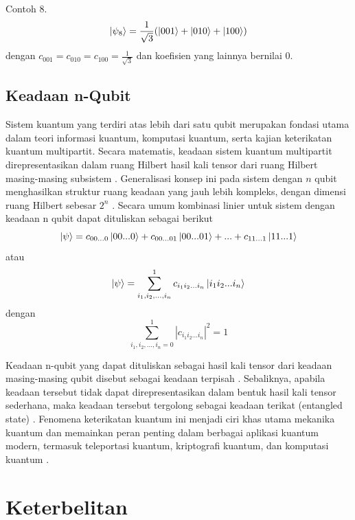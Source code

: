 Contoh 8.
\begin{equation}
	\ket{\psi_8}=\frac{1}{\sqrt{3}}(\ket{001}+\ket{010}+\ket{100})\label{contohkeadaan3qubitketiga}
\end{equation}
dengan $c_{001}=c_{010}=c_{100}=\frac{1}{\sqrt{3}}$ dan koefisien yang lainnya bernilai 0.

\subsection{Keadaan n-Qubit}
\par
Sistem kuantum yang terdiri atas lebih dari satu qubit merupakan fondasi utama dalam teori informasi kuantum, komputasi kuantum, serta kajian keterikatan kuantum multipartit. Secara matematis, keadaan sistem kuantum multipartit direpresentasikan dalam ruang Hilbert hasil kali tensor dari ruang Hilbert masing-masing subsistem \cite{nielsen2010quantum}. Generalisasi konsep ini pada sistem dengan $n$ qubit menghasilkan struktur ruang keadaan yang jauh lebih kompleks, dengan dimensi ruang Hilbert sebesar $2^n$ \cite{preskill_lecture_notes}. Secara umum kombinasi linier untuk sistem dengan keadaan n qubit dapat dituliskan sebagai berikut
\begin{equation}
	\ket{\psi}=c_{00...0}\ket{00...0}+c_{00...01}\ket{00...01}+...+c_{11...1}\ket{11...1}
\end{equation}
atau
\begin{equation}
	\ket{\psi}=\sum_{i_1,i_2,...,i_n}^1 c_{i_1 i_2...i_n}\ket{i_1 i_2...i_n}
\end{equation}
dengan
\begin{equation}
	\sum_{i_1,i_2,...,i_n=0}^{1}|c_{i_1 i_2...i_n}|^2=1
\end{equation}

Keadaan n-qubit yang dapat dituliskan sebagai hasil kali tensor dari keadaan masing-masing qubit disebut sebagai keadaan terpisah \cite{Werner1989,bengtsson2017geometry}. Sebaliknya, apabila keadaan tersebut tidak dapat direpresentasikan dalam bentuk hasil kali tensor sederhana, maka keadaan tersebut tergolong sebagai keadaan terikat (entangled state) \cite{horodecki2009quantum}. Fenomena keterikatan kuantum ini menjadi ciri khas utama mekanika kuantum dan memainkan peran penting dalam berbagai aplikasi kuantum modern, termasuk teleportasi kuantum, kriptografi kuantum, dan komputasi kuantum \cite{bennett_1993}.

\section{Keterbelitan}
